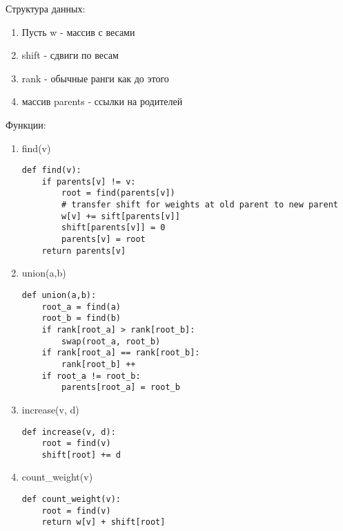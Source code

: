 \documentclass[12pt]{article}
\begin{document}
Структура данных:
\begin{enumerate}
    \item Пусть w - массив с весами
    \item shift - сдвиги по весам
    \item rank - обычные ранги как до этого
    \item массив parents - ссылки на родителей
\end{enumerate}

Функции:
\begin{enumerate}
    \item find(v)
    \begin{lstlisting}
def find(v):
    if parents[v] != v:
        root = find(parents[v])
        # transfer shift for weights at old parent to new parent
        w[v] += sift[parents[v]]
        shift[parents[v]] = 0
        parents[v] = root
    return parents[v]
    \end{lstlisting}
    \item union(a,b)
    \begin{lstlisting}
def union(a,b):
    root_a = find(a)
    root_b = find(b)
    if rank[root_a] > rank[root_b]:
        swap(root_a, root_b)
    if rank[root_a] == rank[root_b]:
        rank[root_b] ++
    if root_a != root_b:
        parents[root_a] = root_b
    \end{lstlisting}
    \item increase(v, d)
    \begin{lstlisting}
def increase(v, d):
    root = find(v)
    shift[root] += d
    \end{lstlisting}
    \item count\_weight(v)
    \begin{lstlisting}
def count_weight(v):
    root = find(v)
    return w[v] + shift[root]
    \end{lstlisting}    
\end{enumerate}
\end{document}
